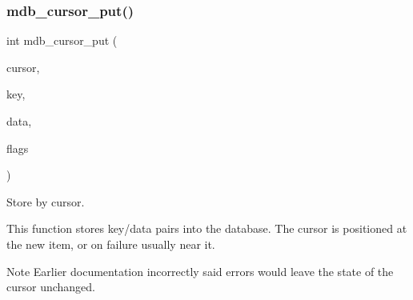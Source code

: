 \subsubsection{\texorpdfstring{mdb\+\_\+cursor\+\_\+put()}{mdb\_cursor\_put()}}
{\footnotesize\ttfamily int mdb\+\_\+cursor\+\_\+put (\begin{DoxyParamCaption}\item[{\mbox{\hyperlink{struct_m_d_b__cursor}{M\+D\+B\+\_\+cursor}} $\ast$}]{cursor,  }\item[{\mbox{\hyperlink{struct_m_d_b__val}{M\+D\+B\+\_\+val}} $\ast$}]{key,  }\item[{\mbox{\hyperlink{struct_m_d_b__val}{M\+D\+B\+\_\+val}} $\ast$}]{data,  }\item[{unsigned int}]{flags }\end{DoxyParamCaption})}



Store by cursor. 

This function stores key/data pairs into the database. The cursor is positioned at the new item, or on failure usually near it. \begin{DoxyNote}{Note}
Earlier documentation incorrectly said errors would leave the state of the cursor unchanged. 
\end{DoxyNote}

